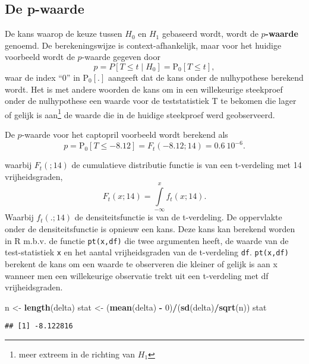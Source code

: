 \documentclass[
  12pt,dutch,coursenotes]{book}
\newenvironment{Shaded}{\begin{snugshade}}{\end{snugshade}}
\newcommand{\DecValTok}[1]{\textcolor[rgb]{0.00,0.00,0.81}{#1}}
\newcommand{\KeywordTok}[1]{\textcolor[rgb]{0.13,0.29,0.53}{\textbf{#1}}}
\newcommand{\NormalTok}[1]{#1}
\newcommand{\OperatorTok}[1]{\textcolor[rgb]{0.81,0.36,0.00}{\textbf{#1}}}
\newcommand{\StringTok}[1]{\textcolor[rgb]{0.31,0.60,0.02}{#1}}
\theoremstyle{definition}
\theoremstyle{definition}
\theoremstyle{definition}
\theoremstyle{remark}
\begin{document}
\hypertarget{de-p-waarde}{%
\subsection{De p-waarde}\label{de-p-waarde}}

De kans waarop de keuze tussen \(H_0\) en \(H_1\) gebaseerd wordt, wordt de \textbf{\(p\)-waarde} genoemd. De berekeningswijze is context-afhankelijk, maar voor het huidige voorbeeld wordt de \(p\)-waarde gegeven door
\[
    p = P\left[T \leq t \mid H_0\right] = \text{P}_0\left[T\leq t\right],
  \]
waar de index ``0'' in \(\text{P}_0\left[.\right]\) aangeeft dat de kans onder de nulhypothese berekend wordt. Het is met andere woorden de kans om in een willekeurige steekproef onder de nulhypothese een waarde voor de teststatistiek T te bekomen die lager of gelijk is aan\footnote{meer extreem in de richting van \(H_1\)} de waarde die in de huidige steekproef werd geobserveerd.

De \(p\)-waarde voor het captopril voorbeeld wordt berekend als
\[p= \text{P}_0\left[T\leq -8.12\right]=F_t(-8.12;14) = 0.6\ 10^{-6}.\]

waarbij \(F_t(;14)\) de cumulatieve distributie functie is van een t-verdeling met 14 vrijheidsgraden,
\[F_t(x;14)=\int\limits_{-\infty}^{x} f_t(x;14).\]
Waarbij \(f_t(.;14)\) de densiteitsfunctie is van de t-verdeling.
De oppervlakte onder de densiteitsfunctie is opnieuw een kans.
Deze kans kan berekend worden in R m.b.v. de functie \texttt{pt(x,df)} die twee argumenten heeft, de waarde van de test-statistiek \texttt{x} en het aantal vrijheidsgraden van de t-verdeling \texttt{df}.
\texttt{pt(x,df)} berekent de kans om een waarde te observeren die kleiner of gelijk is aan x wanneer men een willekeurige observatie trekt uit een t-verdeling met df vrijheidsgraden.

\begin{Shaded}
\begin{Highlighting}[]
\NormalTok{n \textless{}{-}}\StringTok{ }\KeywordTok{length}\NormalTok{(delta)}
\NormalTok{stat \textless{}{-}}\StringTok{ }\NormalTok{(}\KeywordTok{mean}\NormalTok{(delta) }\OperatorTok{{-}}\StringTok{ }\DecValTok{0}\NormalTok{)}\OperatorTok{/}\NormalTok{(}\KeywordTok{sd}\NormalTok{(delta)}\OperatorTok{/}\KeywordTok{sqrt}\NormalTok{(n))}
\NormalTok{stat}
\end{Highlighting}
\end{Shaded}

\begin{verbatim}
## [1] -8.122816
\end{verbatim}
\end{document}

